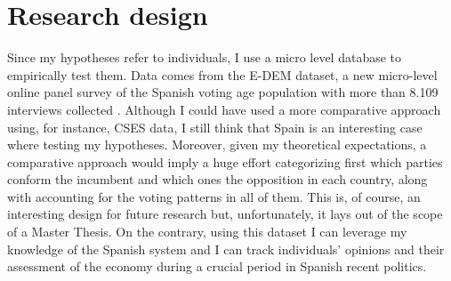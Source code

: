 \documentclass[a4paper, svgnames]{article}
\begin{document}



\section{Research design}

\label{section:research_design}

Since my hypotheses refer to individuals, I use a micro level database to empirically test them. Data comes from the E-DEM dataset, a new micro-level online panel survey of the Spanish voting age population with more than 8.109 interviews collected \citep{Torcal2020}. Although I could have used a more comparative approach using, for instance, CSES data, I still think that Spain is an interesting case where testing my hypotheses. Moreover, given my theoretical expectations, a comparative approach would imply a huge effort categorizing first which parties conform the incumbent and which ones the opposition in each country, along with accounting for the voting patterns in all of them. This is, of course, an interesting design for future research but, unfortunately, it lays out of the scope of a Master Thesis. On the contrary, using this dataset I can leverage my knowledge of the Spanish system and I can track individuals' opinions and their assessment of the economy during a crucial period in Spanish recent politics.
\end{document}
